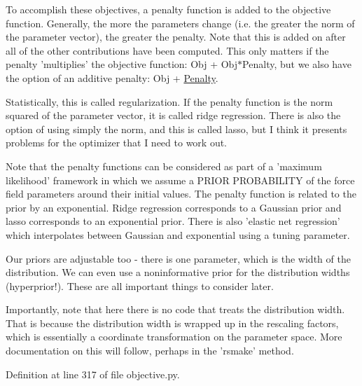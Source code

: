 \-To accomplish these objectives, a penalty function is added to the objective function. \-Generally, the more the parameters change (i.\-e. the greater the norm of the parameter vector), the greater the penalty. \-Note that this is added on after all of the other contributions have been computed. \-This only matters if the penalty 'multiplies' the objective function\-: \-Obj + \-Obj$\ast$\-Penalty, but we also have the option of an additive penalty\-: \-Obj + \hyperlink{classforcebalance_1_1objective_1_1Penalty}{\-Penalty}.

\-Statistically, this is called regularization. \-If the penalty function is the norm squared of the parameter vector, it is called ridge regression. \-There is also the option of using simply the norm, and this is called lasso, but \-I think it presents problems for the optimizer that \-I need to work out.

\-Note that the penalty functions can be considered as part of a 'maximum likelihood' framework in which we assume a \-P\-R\-I\-O\-R \-P\-R\-O\-B\-A\-B\-I\-L\-I\-T\-Y of the force field parameters around their initial values. \-The penalty function is related to the prior by an exponential. \-Ridge regression corresponds to a \-Gaussian prior and lasso corresponds to an exponential prior. \-There is also 'elastic net regression' which interpolates between \-Gaussian and exponential using a tuning parameter.

\-Our priors are adjustable too -\/ there is one parameter, which is the width of the distribution. \-We can even use a noninformative prior for the distribution widths (hyperprior!). \-These are all important things to consider later.

\-Importantly, note that here there is no code that treats the distribution width. \-That is because the distribution width is wrapped up in the rescaling factors, which is essentially a coordinate transformation on the parameter space. \-More documentation on this will follow, perhaps in the 'rsmake' method. 

\-Definition at line 317 of file objective.\-py.



